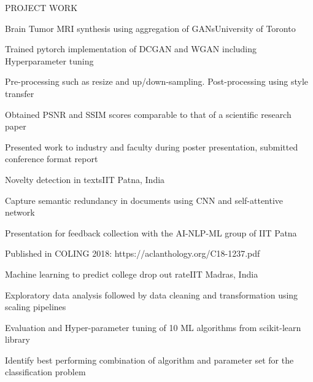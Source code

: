 \documentclass{resume}
\begin{document}
  \begin{rSection}{PROJECT WORK}

    \begin{rSubsection}{Brain Tumor MRI synthesis using aggregation of GANs}{University of Toronto}{}{}
      \item Trained pytorch implementation of DCGAN and WGAN including Hyperparameter tuning
      \item Pre-processing such as resize and up/down-sampling. Post-processing using style transfer
      \item Obtained PSNR and SSIM scores comparable to that of a scientific research paper
      \item Presented work to industry and faculty during poster presentation, submitted conference format report
    \end{rSubsection}

    \begin{rSubsection}{Novelty detection in texts}{IIT Patna, India}{}{}
      \item Capture semantic redundancy in documents using CNN and self-attentive network
      \item Presentation for feedback collection with the AI-NLP-ML group of IIT Patna
      \item Published in COLING 2018: https://aclanthology.org/C18-1237.pdf
    \end{rSubsection}


    \begin{rSubsection}{Machine learning to predict college drop out rate}{IIT Madras, India}{}{}
      \item Exploratory data analysis followed by data cleaning and transformation using scaling pipelines
      \item Evaluation and Hyper-parameter tuning of 10 ML algorithms from scikit-learn library
      \item Identify best performing combination of algorithm and parameter set for the classification problem
    \end{rSubsection}


\end{rSection}
\end{document}
